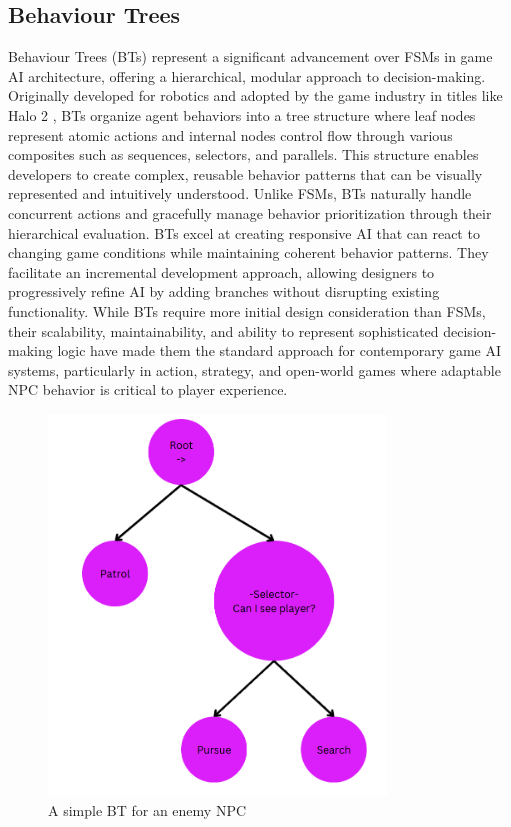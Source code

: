 \subsection{Behaviour Trees}

Behaviour Trees (BTs) represent a significant advancement over FSMs in game AI architecture, offering a hierarchical, modular approach to decision-making. 
Originally developed for robotics and adopted by the game industry in titles like Halo 2 \cite{simulacrum}, BTs organize agent behaviors into a tree structure where leaf nodes represent atomic actions and internal nodes control flow through various composites such as sequences, selectors, and parallels. 
This structure enables developers to create complex, reusable behavior patterns that can be visually represented and intuitively understood. 
Unlike FSMs, BTs naturally handle concurrent actions and gracefully manage behavior prioritization through their hierarchical evaluation.
BTs excel at creating responsive AI that can react to changing game conditions while maintaining coherent behavior patterns. 
They facilitate an incremental development approach, allowing designers to progressively refine AI by adding branches without disrupting existing functionality.
While BTs require more initial design consideration than FSMs, their scalability, maintainability, and ability to represent sophisticated decision-making logic have made them the standard approach for contemporary game AI systems, particularly in action, strategy, and open-world games where adaptable NPC behavior is critical to player experience.

\begin{figure}[h]
    \centering
    \includegraphics[width=0.8\textwidth]{figures/bt.png}
    \caption{A simple BT for an enemy NPC}
    \label{fig:bt}
\end{figure}

